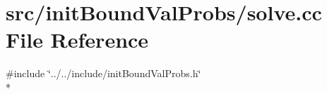 \section{src/init\-Bound\-Val\-Probs/solve.cc File Reference}
\label{solve_8cc}
{\ttfamily \#include \char`\"{}../../include/init\-Bound\-Val\-Probs.\-h\char`\"{}}\\*
